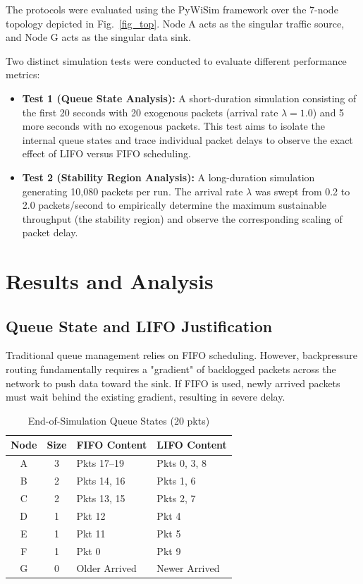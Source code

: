 \documentclass[10pt, twocolumn, letterpaper]{article}
\begin{document}
The protocols were evaluated using the PyWiSim framework over the 7-node topology depicted in Fig.~\ref{fig_top}. Node A acts as the singular traffic source, and Node G acts as the singular data sink. 

Two distinct simulation tests were conducted to evaluate different performance metrics:
\begin{itemize}
    \item \textbf{Test 1 (Queue State Analysis):} A short-duration simulation consisting of the first 20 seconds with 20 exogenous packets (arrival rate $\lambda = 1.0$) and 5 more seconds with no exogenous packets. This test aims to isolate the internal queue states and trace individual packet delays to observe the exact effect of LIFO versus FIFO scheduling.
    \item \textbf{Test 2 (Stability Region Analysis):} A long-duration simulation generating 10,080 packets per run. The arrival rate $\lambda$ was swept from 0.2 to 2.0 packets/second to empirically determine the maximum sustainable throughput (the stability region) and observe the corresponding scaling of packet delay.
\end{itemize}

\section{Results and Analysis}

\subsection{Queue State and LIFO Justification}
Traditional queue management relies on FIFO scheduling. However, backpressure routing fundamentally requires a "gradient" of backlogged packets across the network to push data toward the sink. If FIFO is used, newly arrived packets must wait behind the existing gradient, resulting in severe delay.

\begin{table}[htbp]
\caption{End-of-Simulation Queue States (20 pkts)}
\vspace{0.5em}
\begin{center}
\renewcommand{\arraystretch}{1.2}
\begin{tabularx}{\linewidth}{|c|c|X|X|}
\hline
\textbf{Node} & \textbf{Size} & \textbf{FIFO Content} & \textbf{LIFO Content} \\
\hline
A & 3 & Pkts 17--19 & Pkts 0, 3, 8 \\
\hline
B & 2 & Pkts 14, 16 & Pkts 1, 6 \\
\hline
C & 2 & Pkts 13, 15 & Pkts 2, 7 \\
\hline
D & 1 & Pkt 12 & Pkt 4 \\
\hline
E & 1 & Pkt 11 & Pkt 5 \\
\hline
F & 1 & Pkt 0 & Pkt 9 \\
\hline
G & 0 & Older Arrived & Newer Arrived \\
\hline
\end{tabularx}
\label{tab1}
\end{center}
\end{table}
\end{document}
